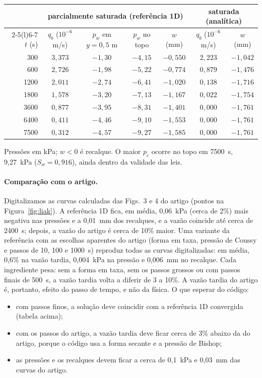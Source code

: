 \documentclass[11pt,a4paper]{article}
\begin{document}
\begin{center}\small
\begin{tabular}{@{}r c c c c c c@{}}
\toprule
& \multicolumn{4}{c}{parcialmente saturada (referência 1D)} & \multicolumn{2}{c}{saturada (analítica)}\\
\cmidrule(lr){2-5}\cmidrule(l){6-7}
$t$ (s) & $q_b$ ($10^{-6}$ m/s) & $p_w$ em $y=0{,}5$ m & $p_w$ no topo & $w$ (mm) & $q_b$ ($10^{-6}$ m/s) & $w$ (mm)\\
\midrule
300 & $3{,}373$ & $-1{,}30$ & $-4{,}15$ & $-0{,}550$ & $2{,}223$ & $-1{,}042$\\
600 & $2{,}726$ & $-1{,}98$ & $-5{,}22$ & $-0{,}774$ & $0{,}879$ & $-1{,}476$\\
1200 & $2{,}011$ & $-2{,}74$ & $-6{,}41$ & $-1{,}020$ & $0{,}138$ & $-1{,}716$\\
1800 & $1{,}578$ & $-3{,}20$ & $-7{,}13$ & $-1{,}167$ & $0{,}022$ & $-1{,}754$\\
3600 & $0{,}877$ & $-3{,}95$ & $-8{,}31$ & $-1{,}401$ & $0{,}000$ & $-1{,}761$\\
6400 & $0{,}411$ & $-4{,}46$ & $-9{,}10$ & $-1{,}553$ & $0{,}000$ & $-1{,}761$\\
7500 & $0{,}312$ & $-4{,}57$ & $-9{,}27$ & $-1{,}585$ & $0{,}000$ & $-1{,}761$\\
\bottomrule
\end{tabular}
\end{center}
Pressões em kPa; $w<0$ é recalque. O maior $p_c$ ocorre no topo em 7500~s, 9,27~kPa
($S_w=0{,}916$), ainda dentro da validade das leis.

\paragraph{Comparação com o artigo.} Digitalizamos as curvas calculadas das Figs.~3 e 4 do
artigo (pontos na Figura~\ref{fig:liak}). A referência 1D fica, em média, 0,06~kPa (cerca de 2\%)
mais negativa nas pressões e a 0,01~mm dos recalques, e a vazão coincide até cerca de 2400~s;
depois, a vazão do artigo é cerca de 10\% maior. Uma variante da referência com as escolhas
aparentes do artigo (forma em taxa, pressão de Coussy e passos de 10, 100 e 1000~s) reproduz
todas as curvas digitalizadas: em média, 0,6\% na vazão tardia, 0,004~kPa na pressão e 0,006~mm
no recalque. Cada ingrediente pesa: sem a forma em taxa, sem os passos grossos ou com passos
finais de 500~s, a vazão tardia volta a diferir de 3 a 10\%. A vazão tardia do artigo é,
portanto, efeito do passo de tempo, e não da física. O que esperar do código:
\begin{itemize}[leftmargin=*]
\item com passos finos, a solução deve coincidir com a referência 1D convergida (tabela acima);
\item com os passos do artigo, a vazão tardia deve ficar cerca de 3\% abaixo da do artigo, porque
  o código usa a forma secante e a pressão de Bishop;
\item as pressões e os recalques devem ficar a cerca de 0,1~kPa e 0,03~mm das curvas do artigo.
\end{itemize}
\end{document}
